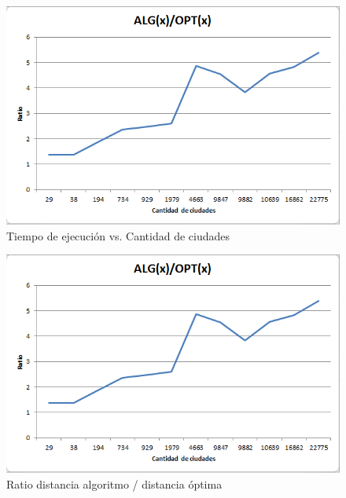 \documentclass[12pt,letterpaper, margin = 3cm]{article}
\begin{document}
 \begin{figure}[ht!]
 \centering
 \includegraphics[scale=0.7]{img/ratioclosest.png}
 \caption{Tiempo de ejecución vs. Cantidad de ciudades}
 \end{figure}
 
  \begin{figure}[ht!]
 \centering
 \includegraphics[scale=0.7]{img/ratioclosest.png}
 \caption{Ratio distancia algoritmo / distancia óptima}
 \end{figure}


\newpage
\end{document}
